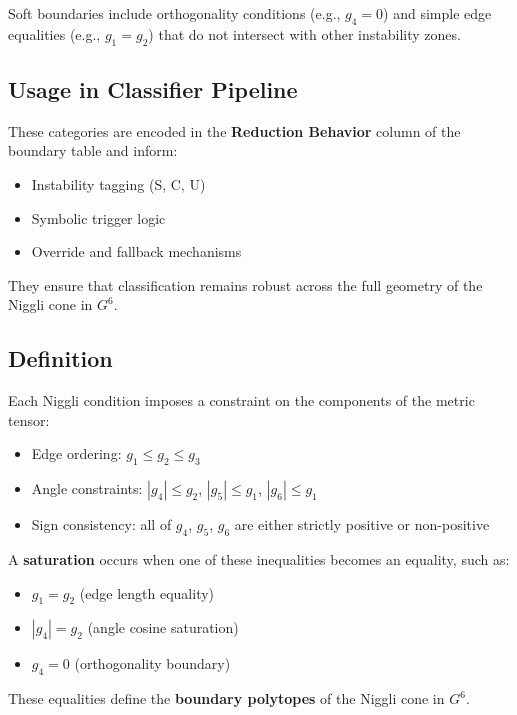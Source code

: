 \documentclass[preprint]{iucr}              %
\begin{document}
Soft boundaries include orthogonality conditions (e.g., $g_4 = 0$) and simple edge equalities (e.g., $g_1 = g_2$) that do not intersect with other instability zones.

\subsection*{Usage in Classifier Pipeline}

These categories are encoded in the \textbf{Reduction Behavior} column of the boundary table and inform:

\begin{itemize}
	\item Instability tagging (S, C, U)
	\item Symbolic trigger logic
	\item Override and fallback mechanisms
\end{itemize}

They ensure that classification remains robust across the full geometry of the Niggli cone in $G^6$.


\subsection*{Definition}

Each Niggli condition imposes a constraint on the components of the metric tensor:

\begin{itemize}
	\item Edge ordering: $g_1 \leq g_2 \leq g_3$
	\item Angle constraints: $|g_4| \leq g_2$, $|g_5| \leq g_1$, $|g_6| \leq g_1$
	\item Sign consistency: all of $g_4$, $g_5$, $g_6$ are either strictly positive or non-positive
\end{itemize}

A \textbf{saturation} occurs when one of these inequalities becomes an equality, such as:

\begin{itemize}
	\item $g_1 = g_2$ \hfill (edge length equality)
	\item $|g_4| = g_2$ \hfill (angle cosine saturation)
	\item $g_4 = 0$ \hfill (orthogonality boundary)
\end{itemize}

These equalities define the \textbf{boundary polytopes} of the Niggli cone in $G^6$.
\end{document}
